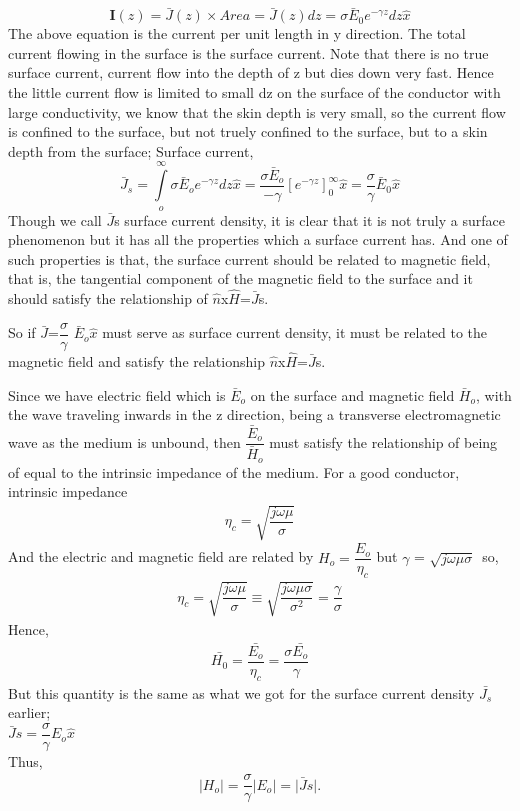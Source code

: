 \begin{dmath}
\textbf{I}(z)=\bar{J}(z)\times Area 
=\bar{J}(z)dz 
=\sigma\bar{E}_0e^{-\gamma z}dz \hat{x}
\end{dmath}
The above equation is the current per unit length in y direction. The total current flowing in the surface is the surface current. Note that there is no true surface current, current flow into the depth of z but dies down very fast. Hence the little current flow is limited to small dz on the surface of the conductor with large conductivity, we know that the skin depth is very small, so the current flow is confined to the surface, but not truely confined to the surface, but to a skin depth from the surface;
Surface current,
\begin{dmath}
\bar{J}_s=\int\limits_o^\infty\sigma\bar{E}_o e^{-\gamma z}dz\hat{x}
=\frac{\sigma\bar{E}_o}{-\gamma}[e^{-\gamma z}]_0^\infty \hat{x}=\frac{\sigma}{\gamma}\bar{E}_0\hat{x}
\end{dmath}
Though we call $\bar{J}$s surface current density, it is clear that it is not truly a surface phenomenon but it has all the properties which a surface current has. And one of such properties is that, the surface current should be related to magnetic field, that is, the tangential component of the magnetic field to the surface and it should satisfy the relationship of $\hat{n}$x$\hat{H}$=$\bar{J}$s. 

So if 
$\bar{J}$=$\dfrac{\sigma}{\gamma}$
$\bar{E}$$_o$$\hat{x}$ must serve as surface current density, it must be related to the magnetic field and satisfy the relationship $\hat{n}$x$\hat{H}$=$\bar{J}$s.

Since we have electric field which is $\bar{E}$$_o$ on the surface and magnetic field $\bar{H}$$_o$, with the wave traveling inwards in the z direction, being a transverse electromagnetic wave as the medium is unbound, then $\dfrac{\bar{E}_o}{\bar{H}_o}$ must satisfy the relationship of being of equal to the intrinsic impedance of the medium.
For a good conductor, intrinsic impedance
\begin{align}
\eta_{c}=\sqrt{\dfrac{j\omega\mu}{\sigma}} 
\end{align} 
And the electric and magnetic field are related by $H_{o}=\dfrac{E_{o}}{\eta_{c}}$
but $\gamma $ = $\sqrt{j\omega\mu\sigma}$\ so,
\begin{align}
\eta_{c}=\sqrt{\dfrac{j\omega\mu}{\sigma}}\equiv\sqrt{\dfrac{j\omega\mu\sigma}{\sigma^{2}}}=\dfrac{\gamma}{\sigma}
\end{align}
Hence,
\begin{align}
\bar{H_{0}}=\dfrac{\bar{E_{o}}}{\eta_{c}}=\dfrac{\sigma \bar{E_{o}}}{\gamma}
\end{align}
But this quantity is the same as what we got for the surface current density $\bar{J_{s}}$ earlier; \\
$\bar{J}s=\dfrac{\sigma}{\gamma}E_{o}\hat{x}$ \\
Thus,
\begin{align}
\lvert H_{o}\rvert=\dfrac{\sigma}{\gamma}\lvert E_{o}\rvert=\rvert \bar{J}s\rvert.
\end{align}

